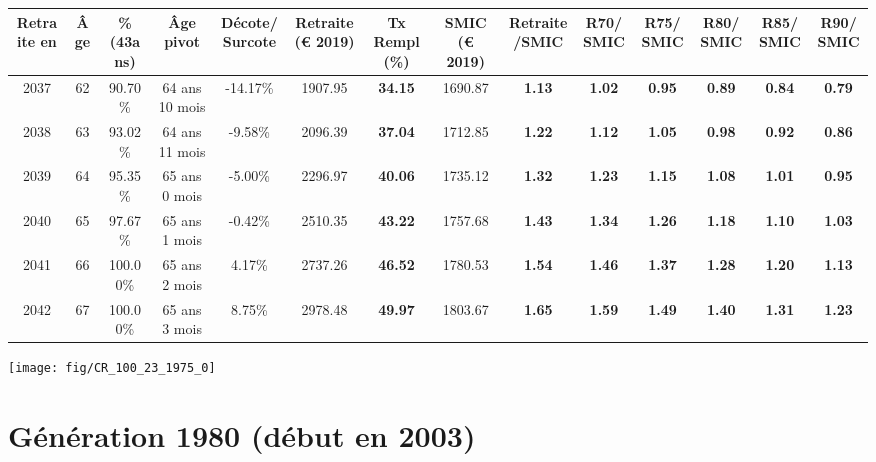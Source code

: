 \begin{adjustbox}{max width=\textwidth} 
\begin{tabular}[htb]{|c|c||c|c|c||c|c||c|c||c|c|c|c|c|} 
\hline 
 Retraite en &  Âge &  \%(43ans) &  Âge pivot &  Décote/Surcote &  Retraite (\euro{} 2019) &  Tx Rempl(\%) &  SMIC (\euro{} 2019) &  Retraite/SMIC &  R70/SMIC &  R75/SMIC &  R80/SMIC &  R85/SMIC &  R90/SMIC \\ 
\hline \hline 
 2037 &  62 &  90.70\% &  64 ans 10 mois &  -14.17\% &  1907.95 &  {\bf 34.15} &  1690.87 &  {\bf 1.13} &  {\bf 1.02} &  {\bf {\color{red} 0.95}} &  {\bf {\color{red} 0.89}} &  {\bf {\color{red} 0.84}} &  {\bf {\color{red} 0.79}} \\ 
\hline 
 2038 &  63 &  93.02\% &  64 ans 11 mois &  -9.58\% &  2096.39 &  {\bf 37.04} &  1712.85 &  {\bf 1.22} &  {\bf 1.12} &  {\bf 1.05} &  {\bf {\color{red} 0.98}} &  {\bf {\color{red} 0.92}} &  {\bf {\color{red} 0.86}} \\ 
\hline 
 2039 &  64 &  95.35\% &  65 ans 0 mois &  -5.00\% &  2296.97 &  {\bf 40.06} &  1735.12 &  {\bf 1.32} &  {\bf 1.23} &  {\bf 1.15} &  {\bf 1.08} &  {\bf 1.01} &  {\bf {\color{red} 0.95}} \\ 
\hline 
 2040 &  65 &  97.67\% &  65 ans 1 mois &  -0.42\% &  2510.35 &  {\bf 43.22} &  1757.68 &  {\bf 1.43} &  {\bf 1.34} &  {\bf 1.26} &  {\bf 1.18} &  {\bf 1.10} &  {\bf 1.03} \\ 
\hline 
 2041 &  66 &  100.00\% &  65 ans 2 mois &  4.17\% &  2737.26 &  {\bf 46.52} &  1780.53 &  {\bf 1.54} &  {\bf 1.46} &  {\bf 1.37} &  {\bf 1.28} &  {\bf 1.20} &  {\bf 1.13} \\ 
\hline 
 2042 &  67 &  100.00\% &  65 ans 3 mois &  8.75\% &  2978.48 &  {\bf 49.97} &  1803.67 &  {\bf 1.65} &  {\bf 1.59} &  {\bf 1.49} &  {\bf 1.40} &  {\bf 1.31} &  {\bf 1.23} \\ 
\hline 
\hline 
\end{tabular} 
\end{adjustbox} 
 
 \vspace{0.1cm} 

 {\hspace{-2.2cm}\texttt{[image: fig/CR\_100\_23\_1975\_0]}} 

\newpage 
 
\section{Génération 1980 (début en 2003)\label{CR_100_23_1980_0}} 
 
